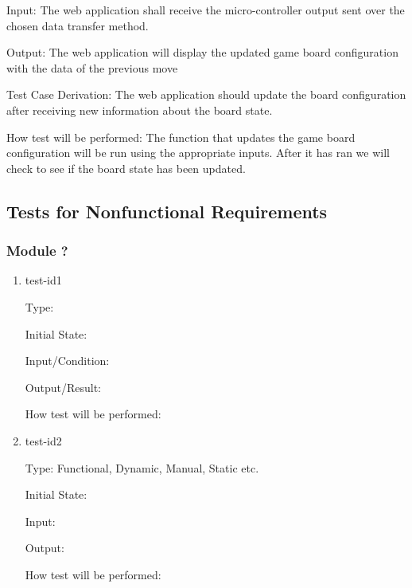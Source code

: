 \documentclass[12pt, titlepage]{article}
\begin{document}
\begin{enumerate}
    Input: The web application shall receive the micro-controller output sent over the chosen data transfer
    method.
                        
    Output: The web application will display the updated game board configuration with the data
    of the previous move
                        
    Test Case Derivation: The web application should update the board configuration after receiving new information about the board state. 

    How test will be performed: The function that updates the game board configuration
    will be run using the appropriate inputs. After it has ran we will check to see if the board state has been updated.

  \end{enumerate}


\subsection{Tests for Nonfunctional Requirements}



\subsubsection{Module ?}
		
\begin{enumerate}

\item{test-id1\\}

Type: 
					
Initial State: 
					
Input/Condition: 
					
Output/Result: 
					
How test will be performed: 
					
\item{test-id2\\}

Type: Functional, Dynamic, Manual, Static etc.
					
Initial State: 
					
Input: 
					
Output: 
					
How test will be performed: 

\end{enumerate}
\end{document}
